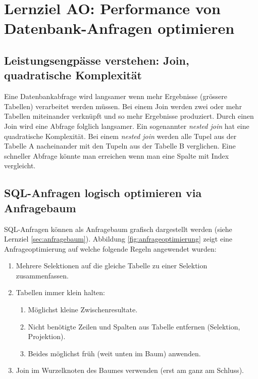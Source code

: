 \section{Lernziel AO: Performance von Datenbank-Anfragen optimieren}

\subsection{Leistungsengpässe verstehen: Join, quadratische Komplexität}

Eine Datenbankabfrage wird langsamer wenn mehr Ergebnisse (grössere Tabellen) verarbeitet werden müssen. Bei einem Join werden zwei oder mehr Tabellen miteinander verknüpft und so mehr Ergebnisse produziert. Durch einen Join wird eine Abfrage folglich langsamer. Ein sogenannter \emph{nested join} hat eine quadratische Komplexität. Bei einem \emph{nested join} werden alle Tupel aus der Tabelle A nacheinander mit den Tupeln aus der Tabelle B verglichen. Eine schneller Abfrage könnte man erreichen wenn man eine Spalte mit Index vergleicht. 

\subsection{SQL-Anfragen logisch optimieren via Anfragebaum}

SQL-Anfragen können als Anfragebaum grafisch dargestellt werden (siehe Lernziel \ref{sec:anfragebaum}). Abbildung \ref{fig:anfrageoptimierung} zeigt eine Anfrageoptimierung auf welche folgende Regeln angewendet wurden:

\begin{enumerate}
	\item Mehrere Selektionen auf die gleiche Tabelle zu einer Selektion zusammenfassen.
	\item Tabellen immer klein halten:
		\begin{enumerate}
			\item Möglichst kleine Zwischenresultate.
			\item Nicht benötigte Zeilen und Spalten aus Tabelle entfernen (Selektion, Projektion).
			\item Beides möglichst früh (weit unten im Baum) anwenden.
		\end{enumerate}
	\item Join im Wurzelknoten des Baumes verwenden (erst am ganz am Schluss).
\end{enumerate}

